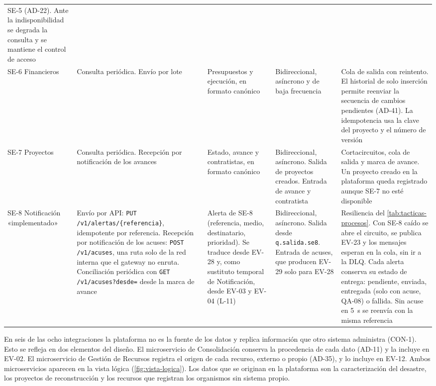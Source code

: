 \documentclass[11pt,letterpaper]{article}
\providecommand{\br}{\discretionary{}{}{}}
\begin{document}
\begin{longtable}{L{2.2cm} L{2.4cm} L{2.4cm} L{3.3cm} L{4.8cm}}
SE-5 (AD-22). Ante la indisponibilidad se degrada la consulta y se mantiene el control de acceso \\
SE-6 Financieros & Consulta periódica. Envío por lote & Presupuestos y ejecución, en formato
canónico & Bidireccional, asíncrono y de baja frecuencia & Cola de salida con reintento. El
historial de solo inserción permite reenviar la secuencia de cambios pendientes (AD-41). La
idempotencia usa la clave del proyecto y el número de versión \\
SE-7 Proyectos & Consulta periódica. Recepción por notificación de los avances & Estado, avance y
contratistas, en formato canónico & Bidireccional, asíncrono. Salida de proyectos creados. Entrada
de avance y contratista & Cortacircuitos, cola de salida y marca de avance. Un proyecto creado en
la plataforma queda registrado aunque SE-7 no esté disponible \\
SE-8 Notificación «implementado» & Envío por API: \texttt{PUT /v1/\br{}alertas/\br{}\{referencia\}}, idempotente
por referencia. Recepción por notificación de los acuses: \texttt{POST /v1/acuses}, una ruta solo de la
red interna que el gateway no enruta. Conciliación periódica con \texttt{GET /v1/\br{}acuses?desde=} desde
la marca de avance & Alerta de SE-8 (referencia, medio, destinatario, prioridad). Se traduce desde
EV-28 y, como sustituto temporal de Notificación, desde EV-03 y EV-04 (L-11) & Bidireccional,
asíncrono. Salida desde \texttt{q.salida.se8}. Entrada de acuses, que producen EV-29 solo para EV-28 &
Resiliencia del \cref{tab:tacticas-procesos}. Con SE-8 caído se abre el circuito, se publica EV-23 y
los mensajes esperan en la cola, sin ir a la DLQ. Cada alerta conserva su estado de entrega:
pendiente, enviada, entregada (solo con acuse, QA-08) o fallida. Sin acuse en \qty{5}{\second} se
reenvía con la misma referencia \\
\end{longtable}

En seis de las ocho integraciones la plataforma no es la fuente de los datos y replica información
que otro sistema administra (CON-1). Esto se refleja en dos elementos del diseño. El microservicio
de Consolidación conserva la procedencia de cada dato (AD-11) y la incluye en EV-02. El
microservicio de Gestión de Recursos registra el origen de cada recurso, externo o propio (AD-35),
y lo incluye en EV-12. Ambos microservicios aparecen en la vista lógica
(\cref{fig:vista-logica}). Los datos que se originan en la plataforma son la caracterización del
desastre, los proyectos de reconstrucción y los recursos que registran los organismos sin sistema
propio.
\end{document}
